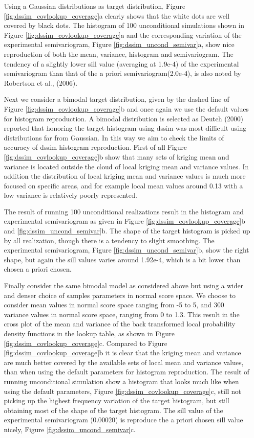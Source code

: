 \documentclass[12t]{article}
\begin{document}
Using a Gaussian distributions as target distribution, Figure
\ref{fig:dssim_covlookup_coverage}a clearly shows that the white dots
are well covered by black dots. The histogram of 100 unconditional
simulations shown in Figure \ref{fig:dssim_covlookup_coverage}a and the corresponding variation of the experimental semivariogram, Figure \ref{fig:dssim_uncond_semivar}a, show nice reproduction of both the mean, variance, histogram and semivariogram. The tendency of a slightly lower sill value (averaging at 1.9e-4) of the experimental semivariogram than that of the a priori semivariogram(2.0e-4), is also noted by Robertson et al., (2006). 

Next we consider a bimodal target distribution, given by the dashed
line of Figure \ref{fig:dssim_covlookup_coverage}b and once again we
use the default values for histogram reproduction. A bimodal
distribution is selected as Deutch (2000) reported that honoring the target histogram using dssim was most difficult using distributions far from Gaussian. In this way we aim to check the limits of accuracy of dssim histogram reproduction.
First of all Figure \ref{fig:dssim_covlookup_coverage}b show that many sets of kriging mean and variance is located outside the cloud of local kriging mean and variance values. In addition the distribution of local kriging mean and variance values is much more focused on specific areas, and for example local mean values around 0.13 with a low variance is relatively poorly represented. 

The result of running 100 unconditional realizations result in the
histogram and experimental semivariogram as given in Figure
\ref{fig:dssim_covlookup_coverage}b and \ref{fig:dssim_uncond_semivar}b. The shape of the target histogram is picked up by all realization, though there is a tendency to slight smoothing. The experimental semivariogram, Figure \ref{fig:dssim_uncond_semivar}b, show the right shape, but again the sill values varies around 1.92e-4, which is a bit lower than chosen a priori chosen.

Finally consider the same bimodal model as considered above but using a wider and denser choice of samples parameters in normal score space.
We choose to consider mean values in normal score space ranging from -5 to 5, and 300
variance values in normal score space, ranging from 0 to 1.3. This
result in the cross plot of the mean and variance of the back transformed
local probability density functions in the lookup table, as shown in
Figure \ref{fig:dssim_covlookup_coverage}c. 
Compared to Figure \ref{fig:dssim_covlookup_coverage}b it is clear that the kriging mean and variance are much better covered by the available sets of local mean and variance values, than when using the default parameters for histogram reproduction.
The result of running unconditional simulation show a histogram that
looks much like when using the default parameters, Figure
\ref{fig:dssim_covlookup_coverage}c, still not picking up the highest
frequency variation of the target histogram, but still obtaining most
of the shape of the target histogram.
The sill value of the experimental semivariogram (0.00020) is
reproduce the a priori chosen sill value nicely, Figure \ref{fig:dssim_uncond_semivar}c.
\end{document}
